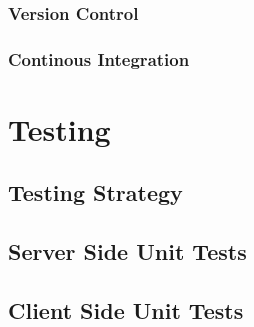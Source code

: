 \subsection{Version Control}

\subsection{Continous Integration}




\chapter{Testing}
%
%
%
%
\section{Testing Strategy}
\section{Server Side Unit Tests}
\section{Client Side Unit Tests}
